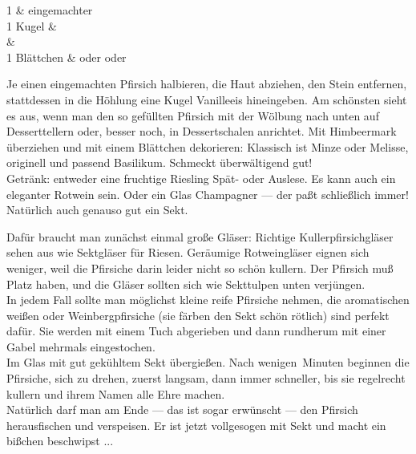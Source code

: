       \begin{zutaten}
        1 & eingemachter  \\
	1 Kugel &  \\
	&  \\
	1 Blättchen &  oder  oder
	               \\
      \end{zutaten}

      \begin{zubereitung}
        Je einen eingemachten Pfirsich halbieren, die Haut abziehen, den Stein
	entfernen, stattdessen in die Höhlung eine Kugel Vanilleeis hineingeben.
	Am schönsten sieht es aus, wenn man den so gefüllten Pfirsich mit der
	Wölbung nach unten auf Desserttellern oder, besser noch, in
	Dessertschalen anrichtet. Mit Himbeermark überziehen und mit einem
	Blättchen dekorieren: Klassisch ist Minze oder Melisse, originell und
	passend Basilikum. Schmeckt überwältigend gut! \\
	Getränk: entweder eine fruchtige Riesling Spät- oder Auslese. Es kann
	auch ein eleganter Rotwein sein. Oder ein Glas Champagner --- der paßt
	schließlich immer! Natürlich auch genauso gut ein Sekt. \\
      \end{zubereitung}


      \begin{zubereitung}
        Dafür braucht man zunächst einmal große Gläser: Richtige
	Kullerpfirsichgläser sehen aus wie Sektgläser für Riesen. Geräumige
	Rotweingläser eignen sich weniger, weil die Pfirsiche darin leider
	nicht so schön kullern. Der Pfirsich muß Platz haben, und die Gläser
	sollten sich wie Sekttulpen unten verjüngen. \\
	In jedem Fall sollte man möglichst kleine reife Pfirsiche nehmen, die
	aromatischen weißen oder Weinbergpfirsiche (sie färben den Sekt schön
	rötlich) sind perfekt dafür. Sie werden mit einem Tuch abgerieben und
	dann rundherum mit einer Gabel mehrmals eingestochen. \\
	Im Glas mit gut gekühltem Sekt übergießen. Nach wenigen~Minuten
	beginnen die Pfirsiche, sich zu drehen, zuerst langsam, dann immer
	schneller, bis sie regelrecht kullern und ihrem Namen alle Ehre machen.
	\\
	Natürlich darf man am Ende --- das ist sogar erwünscht --- den Pfirsich
	herausfischen und verspeisen. Er ist jetzt vollgesogen mit Sekt und
	macht ein bißchen beschwipst ... \\
      \end{zubereitung}

